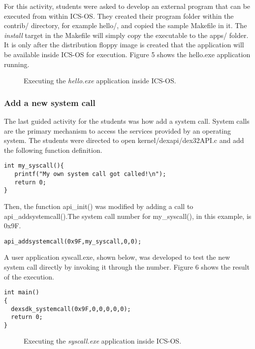 \documentclass{acm_proc_article-sp}
\begin{document}
For this activity, students were asked to develop an external program that can 
be executed from within ICS-OS. They created their program folder within
the contrib/ directory, for example hello/, and copied the sample Makefile in 
it. The \textit{install} target in the Makefile will simply copy the 
executable to the apps/ folder. It is only after the distribution floppy image 
is created that the application will be available inside ICS-OS for execution. 
Figure 5 shows the hello.exe application running.

\begin{figure}
\centering
{}
\caption{Executing the \textit{hello.exe} application inside ICS-OS.}
\end{figure}
 

\subsubsection{Add a new system call}
The last guided activity for the students was how add a system call.
System calls are the primary mechanism to access the services provided 
by an operating system. The students were directed to open 
kernel/dexapi/dex32API.c and add the following function definition.

\begin{verbatim}
int my_syscall(){
   printf("My own system call got called!\n");
   return 0;
}
\end{verbatim}

Then, the function api\_init() was modified by adding a call to 
api\_addsystemcall().The system call number for 
my\_syscall(), in this example, is 0x9F.
\begin{verbatim}
api_addsystemcall(0x9F,my_syscall,0,0);
\end{verbatim}

A user application syscall.exe, shown below, was developed to test the 
new system call directly by invoking it through the number. Figure 6 
shows the result of the execution.

\begin{verbatim}
int main()
{
  dexsdk_systemcall(0x9F,0,0,0,0,0);
  return 0;
}
\end{verbatim}

\begin{figure}
\centering
{}
\caption{Executing the \textit{syscall.exe} application inside ICS-OS.}
\end{figure}
\end{document}
